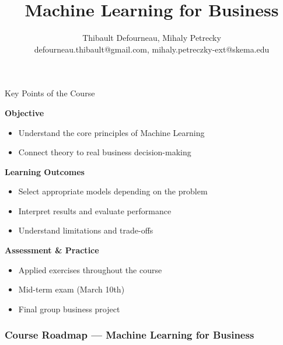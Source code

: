 \documentclass{beamer}
\title{Machine Learning for Business}
\author{ Thibault Defourneau, Mihaly Petrecky \\ 
defourneau.thibault@gmail.com, mihaly.petreczky-ext@skema.edu }
\begin{document}
\begin{frame}\maketitle\end{frame}


\begin{frame}{Key Points of the Course}

\textbf{Objective}

\begin{itemize}
    \item Understand the core principles of Machine Learning
    \item Connect theory to real business decision-making
\end{itemize}

\vspace{0.4cm}

\textbf{Learning Outcomes}

\begin{itemize}
    \item Select appropriate models depending on the problem
    \item Interpret results and evaluate performance
    \item Understand limitations and trade-offs
\end{itemize}

\vspace{0.4cm}

\textbf{Assessment \& Practice}

\begin{itemize}
    \item Applied exercises throughout the course
    \item Mid-term exam (March 10th)
    \item Final group business project
\end{itemize}

\end{frame}



\begin{frame}
\frametitle{Course Roadmap — Machine Learning for Business}

\tableofcontents
\end{frame}



\end{document}
